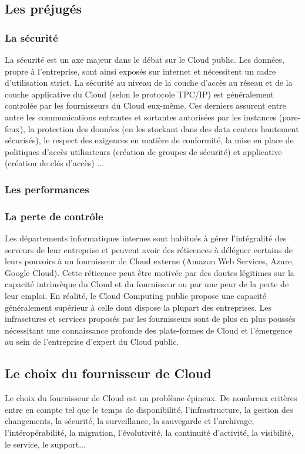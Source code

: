       \subsection{Les préjugés}
        \subsubsection{La sécurité}
        La sécurité est un axe majeur dans le débat sur le Cloud public. Les données, propre à l'entreprise, sont ainsi exposés sur internet et nécessitent un cadre d'utilisation strict. La sécurité au niveau de la couche d'accès au réseau et de la couche applicative du Cloud (selon le protocole TPC/IP) est généralement controlée par les fournisseurs du Cloud eux-même. Ces derniers assurent entre autre les communications entrantes et sortantes autorisées par les instances (pare-feux), la protection des données (en les stockant dans des data centers hautement sécurisés), le respect des exigences en matière de conformité, la mise en place de politiques d'accès utilisateurs (création de groupes de sécurité) et applicative (création de clés d'accès) ...

        \subsubsection{Les performances}

        \subsubsection{La perte de contrôle}
        Les départements informatiques internes sont habitués à gérer l'intégralité des serveurs de leur entreprise et peuvent avoir des réticences à déléguer certains de leurs pouvoirs à un fournisseur de Cloud externe (Amazon Web Services, Azure, Google Cloud). Cette réticence peut être motivée par des doutes légitimes sur la capacité intrinsèque du Cloud et du fournisseur ou par une peur de la perte de leur emploi. En réalité, le Cloud Computing public propose une capacité généralement supérieur à celle dont dispose la plupart des entreprises. Les infrasctures et services proposés par les fournisseurs sont de plus en plus poussés nécessitant une connaissance profonde des plate-formes de Cloud et l'émergence au sein de l'entreprise d'expert du Cloud public.

      \subsection{Le choix du fournisseur de Cloud}
      Le choix du fournisseur de Cloud est un problème épineux. De nombreux critères entre en compte tel que le temps de disponibilité, l'infrastructure, la gestion des changements, la sécurité, la surveillance, la sauvegarde et l'archivage, l'intéropérabilité, la migration, l'évolutivité, la continuité d'activité, la visibilité, le service, le support...\\

